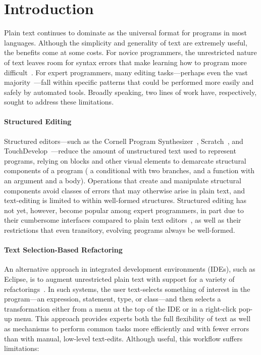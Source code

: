 \section{Introduction}
\label{sec:intro}

Plain text continues to dominate as the universal format for programs
in most languages. Although the simplicity and generality of text are
extremely useful, the benefits come at some costs. For novice
programmers, the unrestricted nature of text leaves room for syntax errors
that make learning how to program more difficult~\cite{GreenfootCost}.
For expert programmers, many editing tasks---perhaps even the vast
majority~\cite{Ko2005}---fall within specific patterns that could be
performed more easily and safely by automated tools. Broadly speaking,
two lines of work have, respectively, sought to address these
limitations.


\paragraph{Structured Editing}

Structured editors---such as
the Cornell Program Synthesizer~\cite{Teitelbaum1981},
Scratch~\cite{Scratch:2009,Scratch:2010}, and
TouchDevelop~\cite{TouchDevelop}---reduce the
amount of unstructured text used to represent programs, relying on
blocks and other visual elements to demarcate structural components of
a program (\eg{} a conditional with two branches, and a function with an
argument and a body). Operations that create and manipulate structural
components avoid classes of errors that may otherwise arise in plain
text, and text-editing is limited to within well-formed structures.
Structured editing has not yet, however, become popular among expert
programmers, in part due to their cumbersome interfaces compared to
plain text editors~\citep{Monig:2015}, as well as their restrictions
that even transitory, evolving programs always be well-formed.

\paragraph{Text Selection-Based Refactoring}

An alternative approach in integrated development environments (IDEs),
such as Eclipse, is to augment unrestricted plain text with support
for a variety of
refactorings~\cite{GriswoldThesis,Fowler1999,SmalltalkRefactoring}. In such
systems, the user text-selects something of interest in the
program---an expression, statement, type, or class---and then selects
a transformation either from a menu at the top of the IDE or
in a right-click pop-up menu. This approach provides experts both the full
flexibility of text as well as mechanisms to perform common tasks more
efficiently and with fewer errors than with manual, low-level text-edits.
Although useful, this workflow suffers limitations:

